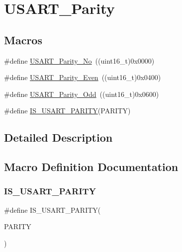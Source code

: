 \hypertarget{group___u_s_a_r_t___parity}{}\section{U\+S\+A\+R\+T\+\_\+\+Parity}
\label{group___u_s_a_r_t___parity}
\subsection*{Macros}
\begin{DoxyCompactItemize}
\item 
\#define \mbox{\hyperlink{group___u_s_a_r_t___parity_gab9deebcb0a859360dfec85074abaa3aa}{U\+S\+A\+R\+T\+\_\+\+Parity\+\_\+\+No}}~((uint16\+\_\+t)0x0000)
\item 
\#define \mbox{\hyperlink{group___u_s_a_r_t___parity_ga62193247d36fffe982e159c1f246271e}{U\+S\+A\+R\+T\+\_\+\+Parity\+\_\+\+Even}}~((uint16\+\_\+t)0x0400)
\item 
\#define \mbox{\hyperlink{group___u_s_a_r_t___parity_gafcd68937a6b4b8ffff8f96e68d6a5ecd}{U\+S\+A\+R\+T\+\_\+\+Parity\+\_\+\+Odd}}~((uint16\+\_\+t)0x0600)
\item 
\#define \mbox{\hyperlink{group___u_s_a_r_t___parity_gaa87b2e338e0ccc42887d3c56901bee87}{I\+S\+\_\+\+U\+S\+A\+R\+T\+\_\+\+P\+A\+R\+I\+TY}}(P\+A\+R\+I\+TY)
\end{DoxyCompactItemize}


\subsection{Detailed Description}


\subsection{Macro Definition Documentation}
\mbox{\label{group___u_s_a_r_t___parity_gaa87b2e338e0ccc42887d3c56901bee87}} 
\subsubsection{\texorpdfstring{IS\_USART\_PARITY}{IS\_USART\_PARITY}}
{\footnotesize\ttfamily \#define I\+S\+\_\+\+U\+S\+A\+R\+T\+\_\+\+P\+A\+R\+I\+TY(\begin{DoxyParamCaption}\item[{}]{P\+A\+R\+I\+TY }\end{DoxyParamCaption})}

